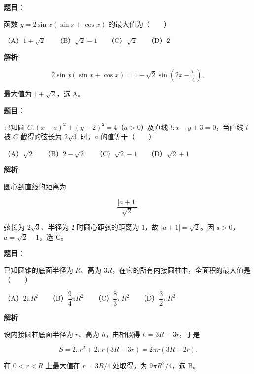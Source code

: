 \begin{answer}

\textbf{题目}：

函数 $y=2\sin x(\sin x+\cos x)$ 的最大值为\mbox{（　　）}

（A）$1+\sqrt2$　　（B）$\sqrt2-1$　　（C）$\sqrt2$　　（D）$2$

\textbf{解析}

\nopagebreak[4]
\[
2\sin x(\sin x+\cos x)
=1+\sqrt2\sin\left(2x-\frac\pi4\right),
\]

最大值为 $1+\sqrt2$，选 A。


\end{answer}
\begin{answer}

\textbf{题目}：

已知圆 $C:(x-a)^2+(y-2)^2=4$（$a>0$）及直线 $l:x-y+3=0$，当直线 $l$ 被 $C$ 截得的弦长为 $2\sqrt3$ 时，$a$ 的值等于\mbox{（　　）}

（A）$\sqrt2$　　（B）$2-\sqrt2$　　（C）$\sqrt2-1$　　（D）$\sqrt2+1$

\textbf{解析}

圆心到直线的距离为

\nopagebreak[4]
\[
\frac{|a+1|}{\sqrt2}.
\]

弦长为 $2\sqrt3$、半径为 $2$ 时圆心距弦的距离为 $1$，故 $|a+1|=\sqrt2$。因 $a>0$，$a=\sqrt2-1$，选 C。


\end{answer}
\begin{answer}

\textbf{题目}：

已知圆锥的底面半径为 $R$、高为 $3R$，在它的所有内接圆柱中，全面积的最大值是\mbox{（　　）}

（A）$2\pi R^2$　　（B）$\dfrac94\pi R^2$　　（C）$\dfrac83\pi R^2$　　（D）$\dfrac32\pi R^2$

\textbf{解析}

设内接圆柱底面半径为 $r$、高为 $h$，由相似得 $h=3R-3r$。于是

\nopagebreak[4]
\[
S=2\pi r^2+2\pi r(3R-3r)=2\pi r(3R-2r).
\]

在 $0<r<R$ 上最大值在 $r=3R/4$ 处取得，为 $9\pi R^2/4$，选 B。


\end{answer}
